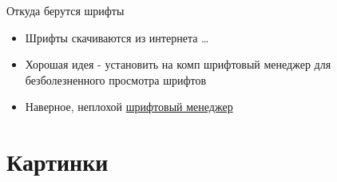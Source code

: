 \documentclass[aspectratio=169]{beamer} %
\begin{document}
{
\begin{frame}{Откуда берутся шрифты}
\Large
\begin{itemize}
\item Шрифты скачиваются из интернета \ldots
\item Хорошая идея - установить на комп шрифтовый менеджер для безболезненного просмотра шрифтов
\item Наверное, неплохой \href{http://fontba.se/}{ шрифтовый менеджер}
\end{itemize}
\end{frame}
}

 
\section{Картинки} 
\end{document}
